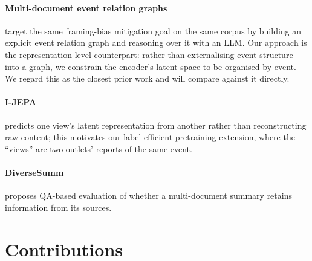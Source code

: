\documentclass[11pt]{article}
\begin{document}
\paragraph{Multi-document event relation graphs} \citep{lei2025multidoc} target
the same framing-bias mitigation goal on the same corpus by building an explicit
event relation graph and reasoning over it with an LLM. Our approach is the
representation-level counterpart: rather than externalising event structure into
a graph, we constrain the encoder's latent space to be organised by event. We
regard this as the closest prior work and will compare against it directly.

\paragraph{I-JEPA} \citep{assran2023ijepa} predicts one view's latent
representation from another rather than reconstructing raw content; this
motivates our label-efficient pretraining extension, where the ``views'' are two
outlets' reports of the same event.

\paragraph{DiverseSumm} \citep{huang2024diversesumm} proposes QA-based
evaluation of whether a multi-document summary retains information from its
sources.

\section{Contributions}
\end{document}
